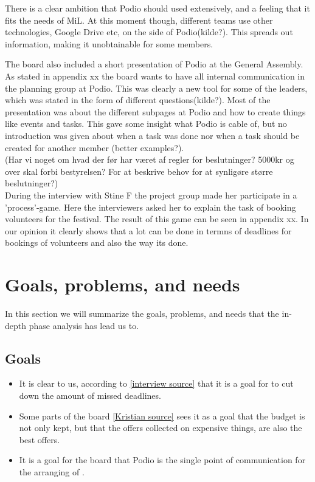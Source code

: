 There is a clear ambition that Podio should used extensively, and a feeling that it fits the needs of MiL. At this moment though, different teams use other technologies, Google Drive etc, on the side of Podio(kilde?). This spreads out information, making it unobtainable for some members. \

The board also included a short presentation of Podio at the General Assembly. As stated in appendix xx the board wants to have all internal communication in the planning group at Podio. This was clearly a new tool for some of the leaders, which was stated in the form of different questions(kilde?). Most of the presentation was about the different subpages at Podio and how to create things like events and tasks. This gave some insight what Podio is cable of, but no introduction was given about when a task was done nor when a task should be created for another member (better examples?).\\

(Har vi noget om hvad der før har været af regler for beslutninger? 5000kr og over skal forbi bestyrelsen? For at beskrive behov for at synligøre større beslutninger?)\\

During the interview with Stine F the project group made her participate in a 'process'-game. Here the interviewers asked her to explain the task of booking volunteers for the festival. The result of this game can be seen in appendix xx. In our opinion it clearly shows that a lot can be done in termns of deadlines for bookings of volunteers and also the way its done.

\section{Goals, problems, and needs}
\label{sec:goprne}
In this section we will summarize the goals, problems, and needs that the
in-depth phase analysis has lead us to.

\subsection{Goals}
\label{subsec:goals}
\begin{itemize}
    \item It is clear to us, according to \ref{interview source} that it is a goal for \mil  to cut down
    the amount of missed deadlines.
    \item Some parts of the board \ref{Kristian source} sees it as a goal that the
    budget is not only kept, but that the offers collected on expensive things, are
    also the best offers.
    \item It is a goal for the board that Podio is the single point of communication
    for the arranging of \mil.
\end{itemize}

